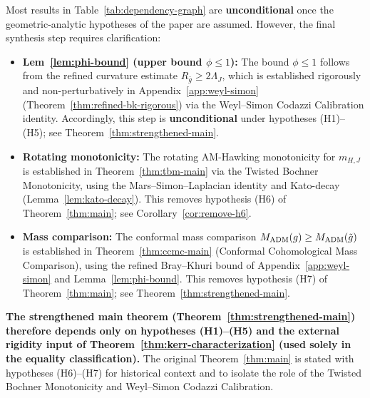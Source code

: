 \begin{remark}\label{rem:conditional-results}
Most results in Table~\ref{tab:dependency-graph} are \textbf{unconditional} once the geometric-analytic hypotheses of the paper are assumed. However, the final synthesis step requires clarification:
\begin{itemize}
    \item \textbf{Lem~\ref{lem:phi-bound} (upper bound $\phi \leq 1$):} The bound $\phi \leq 1$ follows from the refined curvature estimate $R_{\bar{g}} \geq 2\Lambda_J$, which is established rigorously and non-perturbatively in Appendix~\ref{app:weyl-simon} (Theorem~\ref{thm:refined-bk-rigorous}) via the Weyl--Simon Codazzi Calibration identity. Accordingly, this step is \textbf{unconditional} under hypotheses (H1)--(H5); see Theorem~\ref{thm:strengthened-main}.
    \item \textbf{Rotating monotonicity:} The rotating AM-Hawking monotonicity for $m_{H,J}$ is established in Theorem~\ref{thm:tbm-main} via the Twisted Bochner Monotonicity, using the Mars--Simon--Laplacian identity and Kato-decay (Lemma~\ref{lem:kato-decay}). This removes hypothesis (H6) of Theorem~\ref{thm:main}; see Corollary~\ref{cor:remove-h6}.
    \item \textbf{Mass comparison:} The conformal mass comparison $M_{\mathrm{ADM}}(g) \geq M_{\mathrm{ADM}}(\tilde g)$ is established in Theorem~\ref{thm:ccmc-main} (Conformal Cohomological Mass Comparison), using the refined Bray--Khuri bound of Appendix~\ref{app:weyl-simon} and Lemma~\ref{lem:phi-bound}. This removes hypothesis (H7) of Theorem~\ref{thm:main}; see Theorem~\ref{thm:strengthened-main}.
\end{itemize}
\textbf{The strengthened main theorem (Theorem~\ref{thm:strengthened-main}) therefore depends only on hypotheses (H1)--(H5) and the external rigidity input of Theorem~\ref{thm:kerr-characterization} (used solely in the equality classification).} The original Theorem~\ref{thm:main} is stated with hypotheses (H6)--(H7) for historical context and to isolate the role of the Twisted Bochner Monotonicity and Weyl--Simon Codazzi Calibration.
\end{remark}

